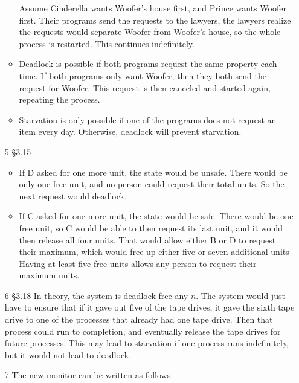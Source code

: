 \documentclass[12pt,letterpaper]{article}
\begin{document}
\begin{enumerate}
\begin{itemize}
          Assume Cinderella wants Woofer's house first,
          and Prince wants Woofer first.
          Their programs send the requests to the lawyers,
          the lawyers realize the requests would separate Woofer from Woofer's house,
          so the whole process is restarted.
          This continues indefinitely.
        \item
          Deadlock is possible if both programs request the same property each time.
          If both programs only want Woofer,
          then they both send the request for Woofer.
          This request is then canceled and started again, repeating the process.
        \item
          Starvation is only possible if one of the programs does not request an item every day.
          Otherwise, deadlock will prevent starvation.
      \end{itemize}
    \item [5 \S 3.15]
      \begin{itemize}
        \item
          If D asked for one more unit, the state would be unsafe.
          There would be only one free unit,
          and no person could request their total units.
          So the next request would deadlock.
        \item
          If C asked for one more unit, the state would be safe.
          There would be one free unit,
          so C would be able to then request its last unit,
          and it would then release all four units.
          That would allow either B or D to request their maximum,
          which would free up either five or seven additional units
          Having at least five free units allows any person to request their maximum units.
      \end{itemize}
    \item [6 \S 3.18]
      In theory, the system is deadlock free any $n$.
      The system would just have to ensure that if it gave out five of the tape drives,
      it gave the sixth tape drive to one of the processes that already had one tape drive.
      Then that process could run to completion,
      and eventually release the tape drives for future processes.
      This may lead to starvation if one process runs indefinitely,
      but it would not lead to deadlock.
    \item [7]
      The new monitor can be written as follows.



\end{enumerate}
\end{document}
